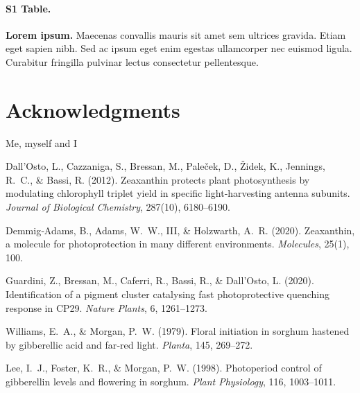 \documentclass[10pt,letterpaper]{article}
\begin{document}
\begin{itemize}
\paragraph*{S1 Table.}
\label{S1_Table}
{\bf Lorem ipsum.} Maecenas convallis mauris sit amet sem ultrices gravida. Etiam eget sapien nibh. Sed ac ipsum eget enim egestas ullamcorper nec euismod ligula. Curabitur fringilla pulvinar lectus consectetur pellentesque.

\section*{Acknowledgments}
Me, myself and I

\nolinenumbers

%
%
% 
\begin{thebibliography}{10}


Dall’Osto, L., Cazzaniga, S., Bressan, M., Paleček, D., Židek, K., Jennings, R.~C., \& Bassi, R. (2012).  
Zeaxanthin protects plant photosynthesis by modulating chlorophyll triplet yield in specific light‐harvesting antenna subunits.  
\emph{Journal of Biological Chemistry}, 287(10), 6180–6190.

Demmig‐Adams, B., Adams, W.~W., III, \& Holzwarth, A.~R. (2020).  
Zeaxanthin, a molecule for photoprotection in many different environments.  
\emph{Molecules}, 25(1), 100.

Guardini, Z., Bressan, M., Caferri, R., Bassi, R., \& Dall’Osto, L. (2020).  
Identification of a pigment cluster catalysing fast photoprotective quenching response in CP29.  
\emph{Nature Plants}, 6, 1261–1273.


Williams, E.~A., \& Morgan, P.~W. (1979).  
Floral initiation in sorghum hastened by gibberellic acid and far‐red light.  
\emph{Planta}, 145, 269–272.

Lee, I.~J., Foster, K.~R., \& Morgan, P.~W. (1998).  
Photoperiod control of gibberellin levels and flowering in sorghum.  
\emph{Plant Physiology}, 116, 1003–1011.


\end{thebibliography}
\end{itemize}
\end{document}
